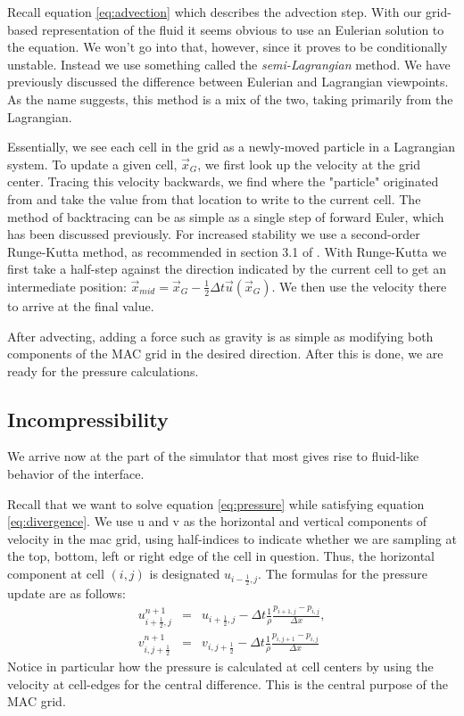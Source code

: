 Recall equation \vref{eq:advection} which describes the advection step. With our grid-based representation of the fluid it seems obvious to use an Eulerian solution to the equation. We won't go into that, however, since it proves to be conditionally unstable. Instead we use something called the \textit{semi-Lagrangian} method. We have previously discussed the difference between Eulerian and Lagrangian viewpoints. As the name suggests, this method is a mix of the two, taking primarily from the Lagrangian.

Essentially, we see each cell in the grid as a newly-moved particle in a Lagrangian system. To update a given cell, $\vec{x}_G$, we first look up the velocity at the grid center. Tracing this velocity backwards, we find where the "particle" originated from and take the value from that location to write to the current cell. The method of backtracing can be as simple as a single step of forward Euler, which has been discussed previously. For increased stability we use a second-order Runge-Kutta method, as recommended in section 3.1 of . With Runge-Kutta we first take a half-step against the direction indicated by the current cell to get an intermediate position: $\vec{x}_{mid} = \vec{x}_G - \frac{1}{2}\Delta t \vec{u}\left(\vec{x}_G\right)$. We then use the velocity there to arrive at the final value.

After advecting, adding a force such as gravity is as simple as modifying both components of the MAC grid in the desired direction. After this is done, we are ready for the pressure calculations.

\subsection{Incompressibility}
We arrive now at the part of the simulator that most gives rise to fluid-like behavior of the interface.

Recall that we want to solve equation \vref{eq:pressure} while satisfying equation \vref{eq:divergence}. We use u and v as the horizontal and vertical components of velocity in the mac grid, using half-indices to indicate whether we are sampling at the top, bottom, left or right edge of the cell in question. Thus, the horizontal component at cell $(i,j)$ is designated $u_{i-\frac{1}{2},j}$. The formulas for the pressure update are as follows:
\begin{eqnarray}
u_{i+\frac{1}{2},j}^{n+1} &=& u_{i+\frac{1}{2},j} - \Delta t\frac{1}{\rho}\frac{p_{i+1,j}-p_{i,j}}{\Delta x},\\
v_{i,j+\frac{1}{2}}^{n+1} &=& v_{i,j+\frac{1}{2}} - \Delta t\frac{1}{\rho}\frac{p_{i,j+1}-p_{i,j}}{\Delta x}
\end{eqnarray}
Notice in particular how the pressure is calculated at cell centers by using the velocity at cell-edges for the central difference. This is the central purpose of the MAC grid.

